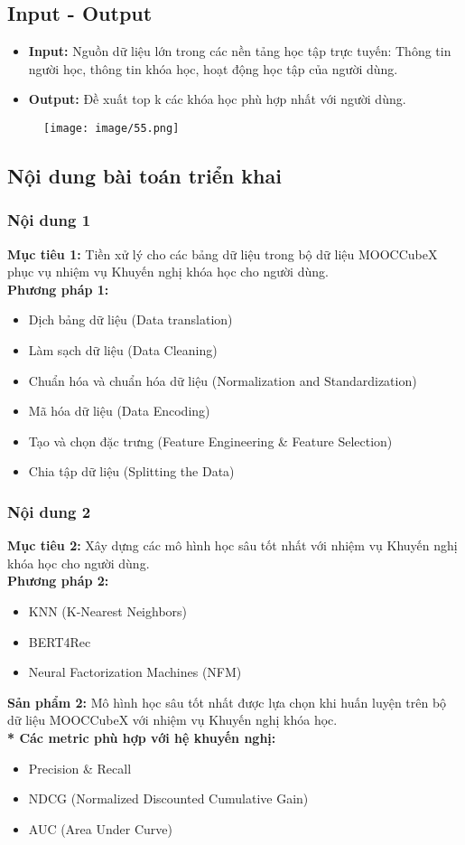 \subsection{Input - Output}
\begin{itemize}
    \item \textbf{Input:} Nguồn dữ liệu lớn trong các nền tảng học tập trực tuyến: Thông tin người học, thông tin khóa học, hoạt động học tập của người dùng.
    \item \textbf{Output:} Đề xuất top k các khóa học phù hợp nhất với người dùng.
\end{itemize}
\begin{figure}[h]
    \centering
    \texttt{[image: image/55.png]}
\end{figure}
\subsection{Nội dung bài toán triển khai}
\subsubsection{Nội dung 1}
\textbf{Mục tiêu 1:} Tiền xử lý cho các bảng dữ liệu trong bộ dữ liệu MOOCCubeX phục vụ nhiệm vụ Khuyến nghị khóa học cho người dùng.\\
\textbf{Phương pháp 1:}
\begin{itemize}
    \item Dịch bảng dữ liệu (Data translation)
    \item Làm sạch dữ liệu (Data Cleaning)
    \item Chuẩn hóa và chuẩn hóa dữ liệu (Normalization and Standardization)
    \item Mã hóa dữ liệu (Data Encoding)
    \item Tạo và chọn đặc trưng (Feature Engineering \& Feature Selection)
    \item Chia tập dữ liệu (Splitting the Data)
\end{itemize}
\subsubsection{Nội dung 2}
\textbf{Mục tiêu 2:} Xây dựng các mô hình học sâu tốt nhất với nhiệm vụ Khuyến nghị khóa học cho người dùng.\\
\textbf{Phương pháp 2:}
\begin{itemize}
    \item KNN (K-Nearest Neighbors)
    \item BERT4Rec
    \item Neural Factorization Machines (NFM)
\end{itemize}
\textbf{Sản phẩm 2:} Mô hình học sâu tốt nhất được lựa chọn khi huấn luyện trên bộ dữ liệu MOOCCubeX với nhiệm vụ Khuyến nghị khóa học.\\
\textbf{* Các metric phù hợp với hệ khuyến nghị:}
\begin{itemize}
    \item Precision \& Recall
    \item NDCG (Normalized Discounted Cumulative Gain)
    \item AUC (Area Under Curve)
\end{itemize}
